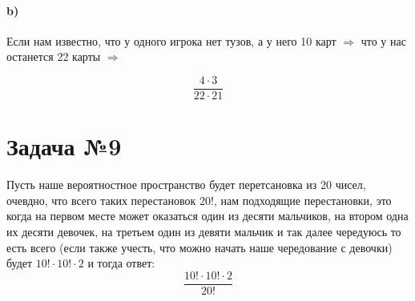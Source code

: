 \documentclass[a4paper, 12pt]{article} %
\begin{document}
    \paragraph*{b)}
    Если нам известно, что у одного игрока нет тузов, а у него 10 карт $\Rightarrow$ что у нас останется 22 карты $\Rightarrow$

\[ \frac{4 \cdot 3}{22 \cdot 21}
    \]

\section*{Задача №9}
Пусть наше вероятностное пространство будет перетсановка из 20 чисел,
очевдно, что всего таких перестановок 20!, нам подходящие перестановки, это
когда на первом месте может оказаться один из десяти мальчиков, на втором одна
их десяти девочек, на третьем один из девяти мальчик и так далее чередуюсь
то есть всего (если также учесть, что можно начать наше чередование с девочки)
будет $10! \cdot 10! \cdot 2$ и тогда ответ:
\[\frac{10! \cdot 10! \cdot 2}{20!}
    \]
\end{document}
